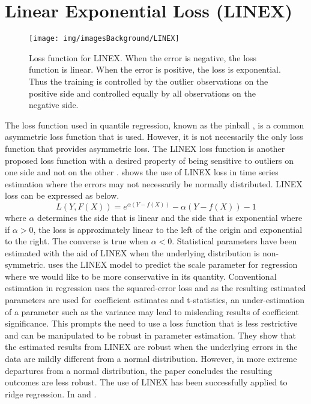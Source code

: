 \section{Linear Exponential Loss (LINEX)}
\begin{figure}
 \centering
\texttt{[image: img/imagesBackground/LINEX]}\\
 \caption{Loss function for LINEX. When the error is negative, the loss function is linear. When the error is positive, the loss is exponential. Thus the training is controlled by the outlier observations on the positive side and controlled equally by all observations on the negative side.}
 \label{Fig:backgroundLINEXLoss}
\end{figure}
The loss function used in quantile regression, known as the pinball \citep{Takeuchi06}, is a common asymmetric loss function that is used. However, it is not necessarily the only loss function that provides asymmetric loss. The LINEX loss function is another proposed loss function with a desired property of being sensitive to outliers on one side and not on the other \citep{Chang07}. \citet{Christoffersen97} shows the use of LINEX loss in time series estimation where the errors may not necessarily be normally distributed. LINEX loss can be expressed as below.
\begin{equation}
	L(Y,F(X))= e^{\alpha(Y-f(X))}-\alpha(Y-f(X))-1
\end{equation}
where $\alpha$ determines the side that is linear and the side that is exponential where if $\alpha>0$, the loss is approximately linear to the left of the origin and exponential to the right. The converse is true when $\alpha <0$. Statistical parameters have been estimated with the aid of LINEX when the underlying distribution is non-symmetric. \citet{Giles93} uses the LINEX model to predict the scale parameter for regression where we would like to be more conservative in its quantity. Conventional estimation in regression uses the squared-error loss and as the resulting estimated parameters are used for coefficient estimates and t-statistics, an under-estimation of a parameter such as the variance may lead to misleading results of coefficient significance. This prompts the need to use a loss function that is less restrictive and can be manipulated to be robust in parameter estimation. They show that the estimated results from LINEX are robust when the underlying errors in the data are mildly different from a normal distribution. However, in more extreme departures from a normal distribution, the paper concludes the resulting outcomes are less robust. The use of LINEX has been successfully applied to ridge regression. In \citet{Ohtani95} and \citet{Fikri03}.

